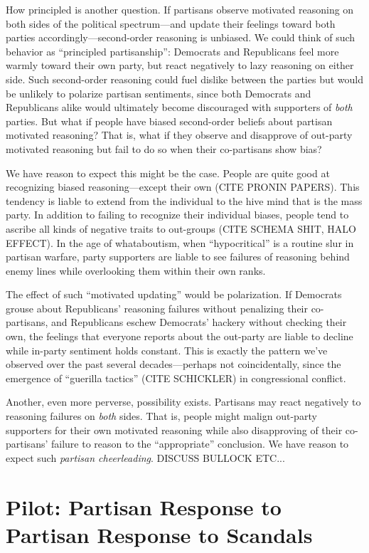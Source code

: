 \documentclass[12pt, letterpaper]{article}
\begin{document}
How principled is another question. If partisans observe motivated reasoning on both sides of the political spectrum---and update their feelings toward both parties accordingly---second-order reasoning is unbiased. We could think of such behavior as ``principled partisanship'': Democrats and Republicans feel more warmly toward their own party, but react negatively to lazy reasoning on either side. Such second-order reasoning could fuel dislike between the parties but would be unlikely to polarize partisan sentiments, since both Democrats and Republicans alike would ultimately become discouraged with supporters of \emph{both} parties. But what if people have biased second-order beliefs about partisan motivated reasoning? That is, what if they observe and disapprove of out-party motivated reasoning but fail to do so when their co-partisans show bias?

We have reason to expect this might be the case. People are quite good at recognizing biased reasoning---except their own (CITE PRONIN PAPERS). This tendency is liable to extend from the individual to the hive mind that is the mass party. In addition to failing to recognize their individual biases, people tend to ascribe all kinds of negative traits to out-groups (CITE SCHEMA SHIT, HALO EFFECT). In the age of whataboutism, when ``hypocritical'' is a routine slur in partisan warfare, party supporters are liable to see failures of reasoning behind enemy lines while overlooking them within their own ranks.

The effect of such ``motivated updating'' would be polarization. If Democrats grouse about Republicans' reasoning failures without penalizing their co-partisans, and Republicans eschew Democrats' hackery without checking their own, the feelings that everyone reports about the out-party are liable to decline while in-party sentiment holds constant. This is exactly the pattern we've observed over the past several decades---perhaps not coincidentally, since the emergence of ``guerilla tactics'' (CITE SCHICKLER) in congressional conflict.

Another, even more perverse, possibility exists. Partisans may react negatively to reasoning failures on \emph{both} sides. That is, people might malign out-party supporters for their own motivated reasoning while also disapproving of their co-partisans' failure to reason to the ``appropriate'' conclusion. We have reason to expect such \emph{partisan cheerleading}. DISCUSS BULLOCK ETC...


\section*{Pilot: Partisan Response to Partisan Response to Scandals}
\end{document}
